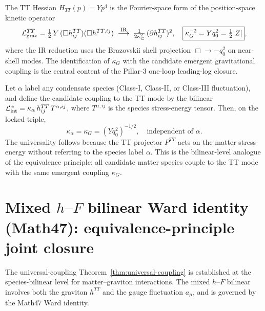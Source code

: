 \begin{theorem}
\label{thm:einstein-kinetic}
The TT Hessian $H_{TT}(p) = Y p^4$ is the Fourier-space form of the
position-space kinetic operator
\begin{equation}
\mathcal{L}_{\rm grav}^{TT} =
\tfrac{1}{2}\, Y\, (\Box h^{TT}_{ij})(\Box h^{TT, ij})
\;\stackrel{\rm IR}{\longrightarrow}\;
\tfrac{1}{2 \kappa_G^2}\, (\partial h^{TT}_{ij})^2,
\quad
\boxed{\kappa_G^{-2} = Y q_0^2 = \tfrac{1}{2}|Z|},
\end{equation}
where the IR reduction uses the Brazovskii shell projection
$\Box \to -q_0^2$ on near-shell modes. The identification of
$\kappa_G$ with the candidate emergent gravitational coupling is
the central content of the Pillar-3 one-loop leading-log closure.
\end{theorem}

\begin{theorem}
\label{thm:universal-coupling}
Let $\alpha$ label any condensate species (Class-I, Class-II, or
Class-III fluctuation), and define the candidate coupling to the
TT mode by the bilinear
$\mathcal{L}_{\rm int}^\alpha = \kappa_\alpha\, h^{TT}_{ij}\,
T^{\alpha, ij}$, where $T^{\alpha, ij}$ is the species
stress-energy tensor. Then, on the locked triple,
\begin{equation}
\boxed{\kappa_\alpha = \kappa_G = (Y q_0^2)^{-1/2},
\quad \text{independent of } \alpha.}
\end{equation}
The universality follows because the TT projector $P^{TT}$ acts on
the matter stress-energy without referring to the species label
$\alpha$. This is the bilinear-level analogue of the equivalence
principle: all candidate matter species couple to the TT mode with
the same emergent coupling $\kappa_G$.
\end{theorem}

\section{Mixed $h$--$F$ bilinear Ward identity (Math47):
equivalence-principle joint closure}\label{sec:Math47}

The universal-coupling Theorem~\ref{thm:universal-coupling} is
established at the species-bilinear level for matter--graviton
interactions. The mixed $h$--$F$ bilinear involves both the
graviton $h^{TT}$ and the gauge fluctuation $a_\mu$, and is
governed by the Math47 Ward identity.

